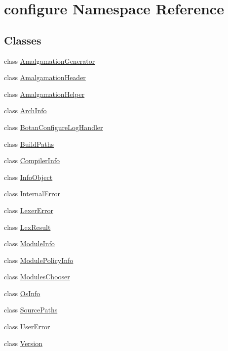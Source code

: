 \hypertarget{namespaceconfigure}{}\section{configure Namespace Reference}
\label{namespaceconfigure}
\subsection*{Classes}
\begin{DoxyCompactItemize}
\item 
class \mbox{\hyperlink{classconfigure_1_1_amalgamation_generator}{Amalgamation\+Generator}}
\item 
class \mbox{\hyperlink{classconfigure_1_1_amalgamation_header}{Amalgamation\+Header}}
\item 
class \mbox{\hyperlink{classconfigure_1_1_amalgamation_helper}{Amalgamation\+Helper}}
\item 
class \mbox{\hyperlink{classconfigure_1_1_arch_info}{Arch\+Info}}
\item 
class \mbox{\hyperlink{classconfigure_1_1_botan_configure_log_handler}{Botan\+Configure\+Log\+Handler}}
\item 
class \mbox{\hyperlink{classconfigure_1_1_build_paths}{Build\+Paths}}
\item 
class \mbox{\hyperlink{classconfigure_1_1_compiler_info}{Compiler\+Info}}
\item 
class \mbox{\hyperlink{classconfigure_1_1_info_object}{Info\+Object}}
\item 
class \mbox{\hyperlink{classconfigure_1_1_internal_error}{Internal\+Error}}
\item 
class \mbox{\hyperlink{classconfigure_1_1_lexer_error}{Lexer\+Error}}
\item 
class \mbox{\hyperlink{classconfigure_1_1_lex_result}{Lex\+Result}}
\item 
class \mbox{\hyperlink{classconfigure_1_1_module_info}{Module\+Info}}
\item 
class \mbox{\hyperlink{classconfigure_1_1_module_policy_info}{Module\+Policy\+Info}}
\item 
class \mbox{\hyperlink{classconfigure_1_1_modules_chooser}{Modules\+Chooser}}
\item 
class \mbox{\hyperlink{classconfigure_1_1_os_info}{Os\+Info}}
\item 
class \mbox{\hyperlink{classconfigure_1_1_source_paths}{Source\+Paths}}
\item 
class \mbox{\hyperlink{classconfigure_1_1_user_error}{User\+Error}}
\item 
class \mbox{\hyperlink{classconfigure_1_1_version}{Version}}
\end{DoxyCompactItemize}
